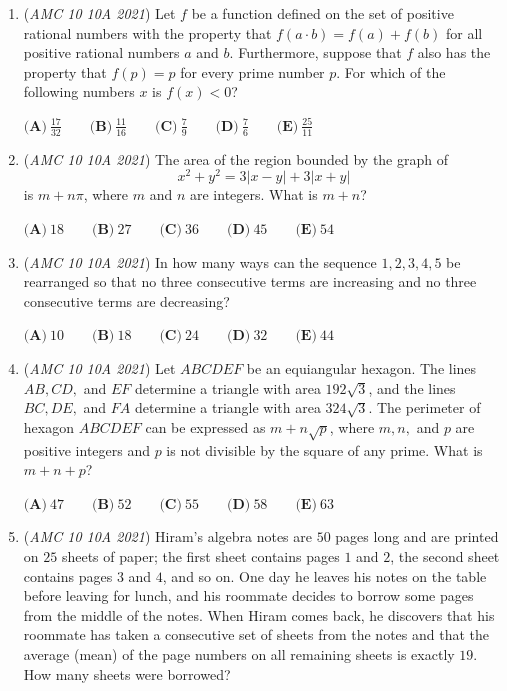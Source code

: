 \begin{enumerate}
 $\textbf{(A)} ~65\qquad\textbf{(B)} ~132\qquad\textbf{(C)} ~157\qquad\textbf{(D)} ~194\qquad\textbf{(E)} ~215$


	\item (\textit{AMC 10 10A 2021}) Let $f$ be a function defined on the set of positive rational numbers with the property that $f(a\cdot b)=f(a)+f(b)$ for all positive rational numbers $a$ and $b$. Furthermore, suppose that $f$ also has the property that $f(p)=p$ for every prime number $p$. For which of the following numbers $x$ is $f(x)<0$?


 $\textbf{(A)} ~\frac{17}{32}\qquad\textbf{(B)} ~\frac{11}{16}\qquad\textbf{(C)} ~\frac{7}{9}\qquad\textbf{(D)} ~\frac{7}{6} \qquad\textbf{(E)} ~\frac{25}{11}$


	\item (\textit{AMC 10 10A 2021}) The area of the region bounded by the graph of 
 \[x^2+y^2 = 3|x-y| + 3|x+y|\]is $m+n\pi$, where $m$ and $n$ are integers. What is $m + n$?


 $\textbf{(A)} ~18\qquad\textbf{(B)} ~27\qquad\textbf{(C)} ~36\qquad\textbf{(D)} ~45\qquad\textbf{(E)} ~54$


	\item (\textit{AMC 10 10A 2021}) In how many ways can the sequence $1, 2, 3, 4, 5$ be rearranged so that no three consecutive terms are increasing and no three consecutive terms are decreasing?


 $\textbf{(A)} ~10\qquad\textbf{(B)} ~18\qquad\textbf{(C)} ~24\qquad\textbf{(D)} ~32\qquad\textbf{(E)} ~44$


	\item (\textit{AMC 10 10A 2021}) Let $ABCDEF$ be an equiangular hexagon. The lines $AB, CD,$ and $EF$ determine a triangle with area $192\sqrt{3}$, and the lines $BC, DE,$ and $FA$ determine a triangle with area $324\sqrt{3}$. The perimeter of hexagon $ABCDEF$ can be expressed as $m +n\sqrt{p}$, where $m, n,$ and $p$ are positive integers and $p$ is not divisible by the square of any prime. What is $m + n + p$?


 $\textbf{(A)} ~47\qquad\textbf{(B)} ~52\qquad\textbf{(C)} ~55\qquad\textbf{(D)} ~58\qquad\textbf{(E)} ~63$


	\item (\textit{AMC 10 10A 2021}) Hiram's algebra notes are $50$ pages long and are printed on $25$ sheets of paper; the first sheet contains pages $1$ and $2$, the second sheet contains pages $3$ and $4$, and so on. One day he leaves his notes on the table before leaving for lunch, and his roommate decides to borrow some pages from the middle of the notes. When Hiram comes back, he discovers that his roommate has taken a consecutive set of sheets from the notes and that the average (mean) of the page numbers on all remaining sheets is exactly $19$. How many sheets were borrowed?



\end{enumerate}
